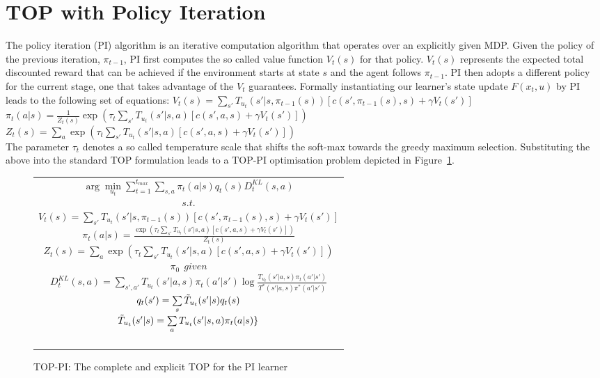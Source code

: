 \documentclass[letterpaper]{aamas2010}
\begin{document}
\section{TOP with Policy Iteration}\label{sec: TOP-PI}
The policy iteration (PI) algorithm is an iterative computation
algorithm that operates over an explicitly given MDP. Given the policy
of the previous iteration, $\pi_{t-1}$, PI first computes the so
called value function $V_t(s)$ for that policy. $V_t(s)$ represents
the expected total discounted reward that can be achieved if the
environment starts at state $s$ and the agent follows $\pi_{t-1}$. PI
then adopts a different policy for the current stage, one that takes
advantage of the $V_t$ guarantees. Formally instantiating our
learner's state update $F(x_t,u)$ by PI leads to the following set of
equations:
{\center 
$V_t(s)=\sum\limits_{s'}T_{u_t}(s'|s,\pi_{t-1}(s))\left[
c(s',\pi_{t-1}(s),s)+\gamma V_t(s')
\right]$\\
$\pi_t(a|s)=\frac{1}{Z_t(s)}\exp\left(\tau_t\sum\limits_{s'}T_{u_t}(s'|s,a)\left[
c(s',a,s)+\gamma V_t(s')
\right]\right)$\\
$Z_t(s)=\sum\limits_a\exp\left(\tau_t\sum\limits_{s'}T_{u_t}(s'|s,a)\left[
c(s',a,s)+\gamma V_t(s')
\right]\right)$\\
}
The parameter $\tau_t$ denotes a so called temperature scale that
shifts the soft-max towards the greedy maximum selection. Substituting
the above into the standard TOP formulation leads to a TOP-PI
optimisation problem depicted in Figure~\ref{t_opt_PI}.
\begin{figure}[th]
\begin{tabular}{|c|} \hline \parbox{3.2 in} {\center 
$\arg\min\limits_{u_t}\sum\limits_{t=1}^{t_{max}}\sum\limits_{s,a}\pi_t(a|s)q_t(s)D^{KL}_t(s,a)$\\
$s.t.$\\
$V_t(s)=\sum\limits_{s'}T_{u_t}(s'|s,\pi_{t-1}(s))\left[
c(s',\pi_{t-1}(s),s)+\gamma V_t(s')
\right]$\\
$\pi_t(a|s)=\frac{\exp\left(\tau_t\sum\limits_{s'}T_{u_t}(s'|s,a)\left[
c(s',a,s)+\gamma V_t(s')
\right]\right)}{Z_t(s)}$\\
$Z_t(s)=\sum\limits_a\exp\left(\tau_t\sum\limits_{s'}T_{u_t}(s'|s,a)\left[
c(s',a,s)+\gamma V_t(s')
\right]\right)$\\
$\pi_0\ \ \displaystyle{given}$\\
$D^{KL}_t(s,a)=\sum\limits_{s',a'}T_{u_t}(s'|a,s)\pi_t(a'|s')\log\frac{T_{u_t}(s'|a,s)\pi_t(a'|s')}{T^*(s'|a,s)\pi^*(a'|s')}$\\
$q_t(s')=\sum\limits_s\Tilde{T}_{u_t}(s'|s)q_t(s)$\\
$\Tilde{T}_{u_t}(s'|s)=\sum\limits_aT_{u_t}(s'|s,a)\pi_t(a|s)\}$\\\ \\
}\\ \hline \end{tabular}
\caption{\label{t_opt_PI}TOP-PI: The complete and explicit TOP for the
  PI learner}
\end{figure}
\end{document}
